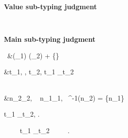 \documentclass{LMCS}
\begin{document}
\begin{figure}
\centering\scriptsize
\begin{minipage}[t]{.9965\linewidth}
\bf Value sub-typing judgment
\end{minipage}\\

\begin{minipage}[t]{.9965\linewidth}
\bf Main sub-typing judgment
\end{minipage}\
      &\sigma\in\dom (\Delta_1) \rightarrow \dom (\Delta_2) + \{\top\}
        \label{eq:st1}\\
      \begin{split}
        &\forall t_1\in\BaseType, \forall \pi\in\AccessPath,  
         \Rightarrow \exists t_2\in \BaseType, t_1 \leq_\sigma t_2 \wedge {} 
      \end{split}
        \label{eq:st2} \\
      &\forall n_2\in\Theta_2, ~ \exists n_1\in\Theta_1,~ \sigma^{-1}(n_2) = \{n_1\} \label{eq:st3}
    
\exists t_1 \leq_\sigma t_2,\quad
{}. 

{}
~~
~~t_1 \sqsubseteq_\sigma t_2~~
~~
{}.


\end{figure}
\end{document}

